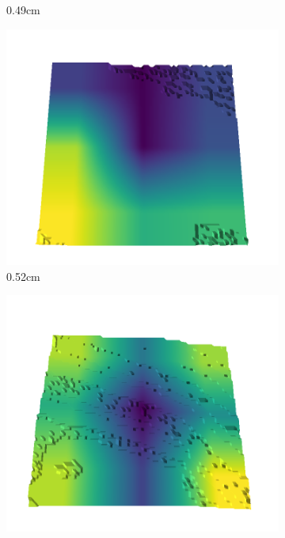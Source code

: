 \begin{figure}[H]
\begin{subfigure}[b]{0.192\linewidth}
    \caption{0.49cm}
    \label{fig : quarry-best-8}
    \end{subfigure}
    \begin{subfigure}[b]{0.192\linewidth}
    \includegraphics[width=\linewidth]{../img/5/quarry/best/51-patch-3d-majavi-colormap-90.png}
    \caption{0.52cm}
    \label{fig : quarry-best-9}
    \end{subfigure}
    \begin{subfigure}[b]{0.192\linewidth}
    \includegraphics[width=\linewidth]{../img/5/quarry/best/54-patch-3d-majavi-colormap-100.png}

\end{subfigure}
\end{figure}
